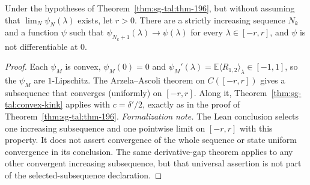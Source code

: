 \begin{theorem}\label{thm:sg-tal:coupled-subsequence}
\leanok
{}
Under the hypotheses of Theorem~\ref{thm:sg-tal:thm-196}, but without assuming that $\lim_N\psi_N(\lambda)$ exists, let $r>0$.
There are a strictly increasing sequence $N_k$ and a function $\psi$ such that $\psi_{N_k+1}(\lambda)\to\psi(\lambda)$ for every $\lambda\in[-r,r]$,
and $\psi$ is not differentiable at $0$.
\end{theorem}
\begin{proof}
\leanok
Each $\psi_M$ is convex, $\psi_M(0)=0$ and $\psi_M'(\lambda)=\mathbb E\langle R_{1,2}\rangle_\lambda\in[-1,1]$, so the $\psi_M$ are $1$-Lipschitz.
The Arzela--Ascoli theorem on $C([-r,r])$ gives a subsequence that converges (uniformly) on $[-r,r]$. Along it, Theorem~\ref{thm:sg-tal:convex-kink} applies with $c=\delta'/2$, exactly as in the proof of Theorem~\ref{thm:sg-tal:thm-196}.
\emph{Formalization note.} The Lean conclusion selects one increasing subsequence and one pointwise limit on $[-r,r]$ with this property. It does not assert convergence of the whole sequence or state uniform convergence in its conclusion. The same derivative-gap theorem applies to any other convergent increasing subsequence, but that universal assertion is not part of the selected-subsequence declaration.
\end{proof}

